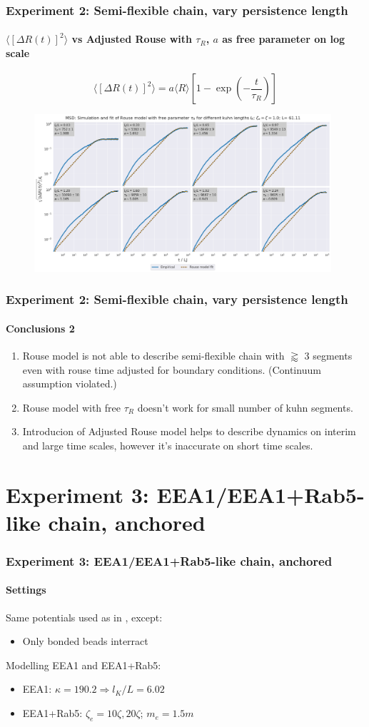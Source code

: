 \documentclass[handout]{beamer}
\newcommand{\mean}[1]{\langle #1 \rangle}
\begin{document}
\begin{frame}
    \frametitle{Experiment 2: Semi-flexible chain, vary persistence length}
    \framesubtitle{$\mean{[\Delta R(t)]^2}$ vs Adjusted Rouse with $\tau_R$, $a$ as free parameter on log scale}
    $$ \mean{[\Delta R(t)]^2} = a \mean{R} [1 - \exp(-\frac{t}{\tau_R})] $$
    \begin{figure}[h]
        \includegraphics[width=11cm]{./4-exp-delta_R-rouse_fit-tau-a_log.png}
    \end{figure}
\end{frame}

\begin{frame}
    \frametitle{Experiment 2: Semi-flexible chain, vary persistence length}
    \framesubtitle{Conclusions 2}
    \begin{enumerate}
        \item Rouse model is not able to describe semi-flexible chain with $\gtrapprox$ 3 segments
        even with rouse time adjusted for boundary conditions. (Continuum assumption violated.)
        \item Rouse model with free $\tau_R$ doesn't work for small number 
        of kuhn segments.
        \item Introducion of Adjusted Rouse model helps to describe dynamics on 
        interim and large time scales, however it's inaccurate on short time scales.
    \end{enumerate}
\end{frame}

\section{Experiment 3: EEA1/EEA1+Rab5-like chain, anchored}

\begin{frame}
    \frametitle{Experiment 3: EEA1/EEA1+Rab5-like chain, anchored}
    \framesubtitle{Settings}
    Same potentials used as in \cite[Section 2.1]{svaneborg_2020}, except:
    \begin{itemize}
        \item Only bonded beads interract
    \end{itemize}
    Modelling EEA1 and EEA1+Rab5:
    \begin{itemize}
        \item EEA1: $\kappa = 190.2 \Rightarrow l_K/L=6.02$ 
        \item EEA1+Rab5: $\zeta_e = 10\zeta, 20\zeta$; $m_e=1.5m$
    \end{itemize}
\end{frame}
\end{document}
